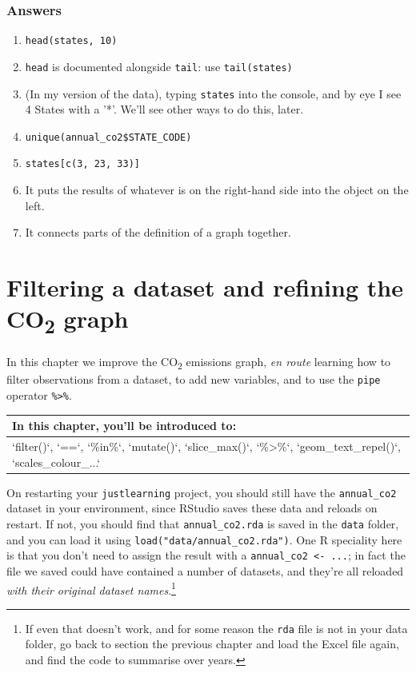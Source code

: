 \documentclass[
]{book}
\providecommand{\tightlist}{%
  \setlength{\itemsep}{0pt}\setlength{\parskip}{0pt}}
\begin{document}
\hypertarget{answers-1}{%
\subsection{Answers}\label{answers-1}}

\begin{enumerate}
\def\labelenumi{\arabic{enumi})}
\tightlist
\item
  \texttt{head(states,\ 10)}
\item
  \texttt{head} is documented alongside \texttt{tail}: use \texttt{tail(states)}
\item
  (In my version of the data), typing \texttt{states} into the console, and by eye I see 4 States with a '*'. We'll see other ways to do this, later.
\item
  \texttt{unique(annual\_co2\$STATE\_CODE)}
\item
  \texttt{states{[}c(3,\ 23,\ 33){]}}
\item
  It puts the results of whatever is on the right-hand side into the object on the left.
\item
  It connects parts of the definition of a graph together.
\end{enumerate}

\hypertarget{filtering-a-dataset-and-refining-the-co2-graph}{%
\chapter{\texorpdfstring{Filtering a dataset and refining the CO\textsubscript{2} graph}{Filtering a dataset and refining the CO2 graph}}\label{filtering-a-dataset-and-refining-the-co2-graph}}

In this chapter we improve the CO\textsubscript{2} emissions graph, \emph{en route} learning how to filter observations from a dataset, to add new variables, and to use the \texttt{pipe} operator \texttt{\%\textgreater{}\%}.

\begin{tabular}{l}
\hline
In this chapter, you'll be introduced to:\\
\hline
`filter()`, `==`, `\%in\%`, `mutate()`, `slice\_max()`, `\%>\%`, `geom\_text\_repel()`, `scales\_colour\_...`\\
\hline
\end{tabular}

On restarting your \texttt{justlearning} project, you should still have the \texttt{annual\_co2} dataset in your environment, since RStudio saves these data and reloads on restart. If not, you should find that \texttt{annual\_co2.rda} is saved in the \texttt{data} folder, and you can load it using \texttt{load("data/annual\_co2.rda")}. One R speciality here is that you don't need to assign the result with a \texttt{annual\_co2\ \textless{}-\ ...}; in fact the file we saved could have contained a number of datasets, and they're all reloaded \emph{with their original dataset names}.\footnote{If even that doesn't work, and for some reason the \texttt{rda} file is not in your data folder, go back to section the previous chapter and load the Excel file again, and find the code to summarise over years.}
\end{document}
